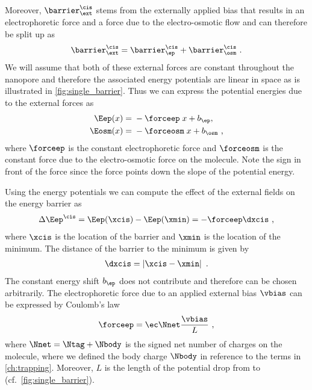 Moreover, $\barrier^\cis_\ext$ stems from the externally applied bias that results in an electrophoretic force
and a force due to the electro-osmotic flow and can therefore be split up as
%
\begin{align}\label{eq:barrier_ext}
    \barrier^\cis_\ext = \barrier^\cis_\ep + \barrier^\cis_\osm
    \text{ .}
\end{align}
%
We will assume that both of these external forces are constant throughout the nanopore and therefore the
associated energy potentials are linear in space as is illustrated in \cref{fig:single_barrier}. Thus we can
express the potential energies due to the external forces as
%
\begin{align*}
    \Eep(x)   ={}& -\forceep \;x + b_{\ep},\\
    \Eosm(x)  ={}& -\forceosm\; x + b_{\osm}
    \text{ ,}
\end{align*}
%
where $\forceep$ is the constant electrophoretic force and $\forceosm$ is the constant force due to the
electro-osmotic force on the molecule. Note the sign in front of the force since the force points down the
slope of the potential energy.

Using the energy potentials we can compute the effect of the external fields on the energy barrier as
%
\begin{align*}
    \Delta \Eep^\cis = \Eep(\xcis) - \Eep(\xmin)
    = - \forceep \dxcis
    \text{ ,}
\end{align*}
%
where $\xcis$ is the location of the barrier and $\xmin$ is the location of the minimum. The distance of the
barrier to the minimum is given by
%
\begin{align*}
    \dxcis = \left|\xcis - \xmin\right|
    \text{ .}
\end{align*}
%
The constant energy shift $b_{\ep}$ does not contribute and therefore can be chosen arbitrarily. The
electrophoretic force due to an applied external bias $\vbias$ can be expressed by Coulomb's law
%
\begin{align}\label{eq:forceep}
    \forceep = \ec \Nnet   \frac{\vbias}{L}
    \text{ ,}
\end{align}
%
where $\Nnet = \Ntag +\Nbody$ is the signed net number of charges on the molecule, where we defined the body
charge $\Nbody$ in reference to the terms in \cref{ch:trapping}. Moreover, $L$ is the length of the potential
drop from \cisi{} to \transi{} (cf.~\cref{fig:single_barrier}).

